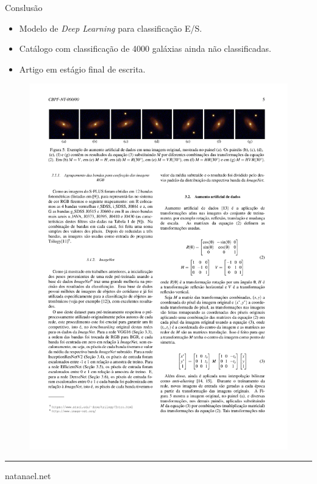 \documentclass[10pt,xcolor=svgnames]{beamer}
\begin{document}
\begin{frame}{Conslusão}
  \begin{minipage}{0.45\textwidth}
    \begin{itemize}
      \item Modelo de \emph{Deep Learning} para classificação E/S.
      \item Catálogo com classificação de 4000 galáxias ainda não classificadas.
      \item Artigo em estágio final de escrita.
    \end{itemize}
  \end{minipage}\hfill
  \begin{minipage}{0.5\textwidth}
    \begin{figure}
      \includegraphics[height=0.9\textheight]{papers/artigo-5.pdf}
    \end{figure}
  \end{minipage}
\end{frame}

\begin{frame}[standout]

  \rule{\textwidth}{0.3pt}

  \vspace{2mm}

  natanael.net
\end{frame}
\end{document}
